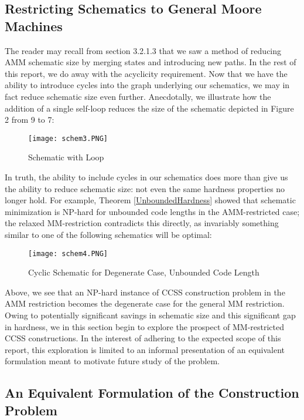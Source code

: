 \documentclass{article}
\theoremstyle{definition}
\begin{document}

\subsection{Restricting Schematics to General Moore Machines}

The reader may recall from section 3.2.1.3 that we saw a method of reducing 
AMM schematic size by merging states and introducing new paths.  In the rest of this 
report, we do away with the acyclicity requirement.  Now that we have the 
ability to introduce cycles into the graph underlying our schematics, we may 
in fact reduce schematic size even further.  Anecdotally, we illustrate how 
the addition of a single self-loop reduces the size of the schematic depicted 
in Figure 2 from 9 to 7:

\begin{figure}[H]
    \centering
    \texttt{[image: schem3.PNG]}
    \caption{Schematic with Loop}
    \label{fig3}
\end{figure}

In truth, the ability to include cycles in our schematics does more than give 
us the ability to reduce schematic size: not even the same hardness properties no 
longer hold.  For example, Theorem \ref{UnboundedHardness} showed that 
schematic minimization is NP-hard for unbounded code lengths in the AMM-restricted
case; the relaxed MM-restriction contradicts this directly, as invariably 
something similar to one of the following schematics will be optimal:

\begin{figure}[H]
    \centering
    \texttt{[image: schem4.PNG]}
    \caption{Cyclic Schematic for Degenerate Case, Unbounded Code Length}
    \label{fig4}
\end{figure}

\noindent Above, we see that an NP-hard instance of CCSS construction problem in the 
AMM restriction becomes the degenerate case for the general MM restriction.  
Owing to potentially significant savings in schematic size and this 
significant gap in hardness, we in this section begin to explore the prospect of 
MM-restricted CCSS constructions.  In the interest of adhering to the expected 
scope of this report, this exploration is limited to an informal presentation of 
an equivalent formulation meant to motivate future study of the problem.

\subsection{An Equivalent Formulation of the Construction Problem}
\end{document}
